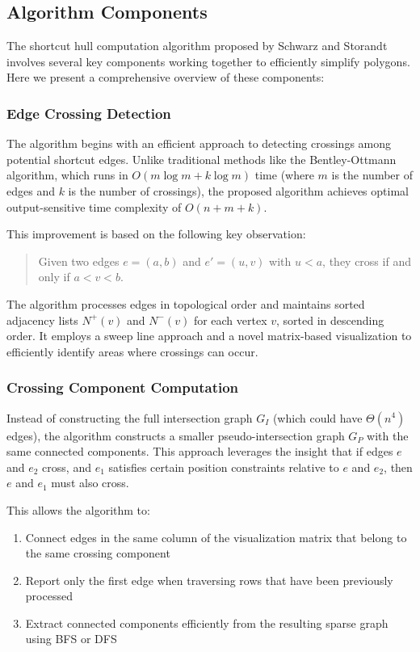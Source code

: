 \documentclass[11pt]{article}
\begin{document}
\subsection{Algorithm Components}

The shortcut hull computation algorithm proposed by Schwarz and Storandt involves several key components working together to efficiently simplify polygons. Here we present a comprehensive overview of these components:

\subsubsection{Edge Crossing Detection}

The algorithm begins with an efficient approach to detecting crossings among potential shortcut edges. Unlike traditional methods like the Bentley-Ottmann algorithm, which runs in $O(m \log m + k \log m)$ time (where $m$ is the number of edges and $k$ is the number of crossings), the proposed algorithm achieves optimal output-sensitive time complexity of $O(n + m + k)$.

This improvement is based on the following key observation:
\begin{quote}
    Given two edges $e = (a, b)$ and $e' = (u, v)$ with $u < a$, they cross if and only if $a < v < b$.
\end{quote}

The algorithm processes edges in topological order and maintains sorted adjacency lists $N^+(v)$ and $N^-(v)$ for each vertex $v$, sorted in descending order. It employs a sweep line approach and a novel matrix-based visualization to efficiently identify areas where crossings can occur.

\subsubsection{Crossing Component Computation}

Instead of constructing the full intersection graph $G_I$ (which could have $\Theta(n^4)$ edges), the algorithm constructs a smaller pseudo-intersection graph $G_P$ with the same connected components. This approach leverages the insight that if edges $e$ and $e_2$ cross, and $e_1$ satisfies certain position constraints relative to $e$ and $e_2$, then $e$ and $e_1$ must also cross.

This allows the algorithm to:
\begin{enumerate}

    \item Connect edges in the same column of the visualization matrix that belong to the same crossing component
    \item Report only the first edge when traversing rows that have been previously processed
    \item Extract connected components efficiently from the resulting sparse graph using BFS or DFS
\end{enumerate}
\end{document}
